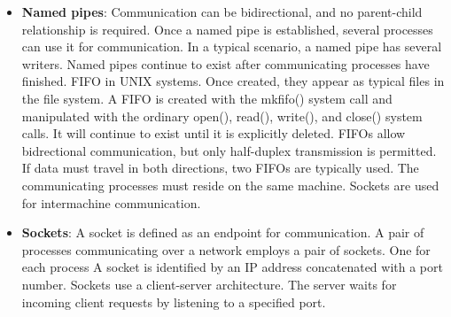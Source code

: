\documentclass{report}
\begin{document}
\begin{itemize}
            ON UNIX systems, ordinary pipes are constructed using the function:
            \bigbreak \noindent 
            \begin{cppcode}
                pipe(int fd[]);
            \end{cppcode}
        \item \textbf{Named pipes}: Communication can be bidirectional, and no parent-child relationship is required. Once a named pipe is established, several processes can use it for communication. In a typical scenario, a named pipe has several writers. Named pipes continue to exist after communicating processes have finished.
            \bigbreak \noindent 
            FIFO in UNIX systems. Once created, they appear as typical files in the file system. A FIFO is created with the mkfifo() system call and manipulated with the ordinary open(), read(), write(), and close() system calls. It will continue to exist until it is explicitly deleted.
            \bigbreak \noindent 
            FIFOs allow bidrectional communication, but only half-duplex transmission is permitted. If data must travel in both directions, two FIFOs are typically used.
            \bigbreak \noindent 
            The communicating processes must reside on the same machine. Sockets are used for intermachine communication.
        \item \textbf{Sockets}: A socket is defined as an endpoint for communication. A pair of processes communicating over a network employs a pair of sockets. One for each process
            \bigbreak \noindent 
            A socket is identified by an IP address concatenated with a port number. Sockets use a client-server architecture. The server waits for incoming client requests by listening to a specified port.

    \end{itemize}
\end{document}
